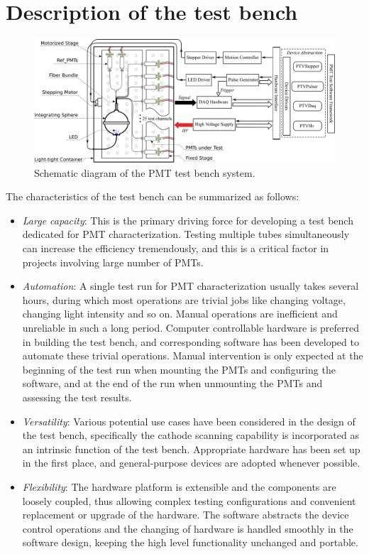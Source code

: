 \documentclass{nst}
\begin{document}
\section{Description of the test bench}
\label{sec:description}

\begin{figure}[!htb]
	\centering
	\includegraphics[width=150mm]{FIG1}
	\caption{Schematic diagram of the PMT test bench system.}
	\label{fig:FIG1}
\end{figure}

The characteristics of the test bench can be summarized as follows:
\begin{itemize}
	\item \textit{Large capacity}: This is the primary driving force for developing a test bench dedicated for PMT characterization.
	Testing multiple tubes simultaneously can increase the efficiency tremendously, and this is a critical factor in projects involving large number of PMTs. 
	\item \textit{Automation}: A single test run for PMT characterization usually takes several hours, during which most operations are trivial jobs like changing voltage, changing light intensity and so on.
	Manual operations are inefficient and unreliable in such a long period.
	Computer controllable hardware is preferred in building the test bench, and corresponding software has been developed to automate these trivial operations.
	Manual intervention is only expected at the beginning of the test run when mounting the PMTs and configuring the software, and at the end of the run when unmounting the PMTs and assessing the test results.
	\item \textit{Versatility}: Various potential use cases have been considered in the design of the test bench, specifically the cathode scanning capability is incorporated as an intrinsic function of the test bench.
	Appropriate hardware has been set up in the first place, and general-purpose devices are adopted whenever possible.
	\item \textit{Flexibility}: %
	The hardware platform is extensible and the components are loosely coupled, thus allowing complex testing configurations and convenient replacement or upgrade of the hardware.
	The software abstracts the device control operations and the changing of hardware is handled smoothly in the software design, keeping the high level functionality unchanged and portable. 
\end{itemize}
\end{document}
